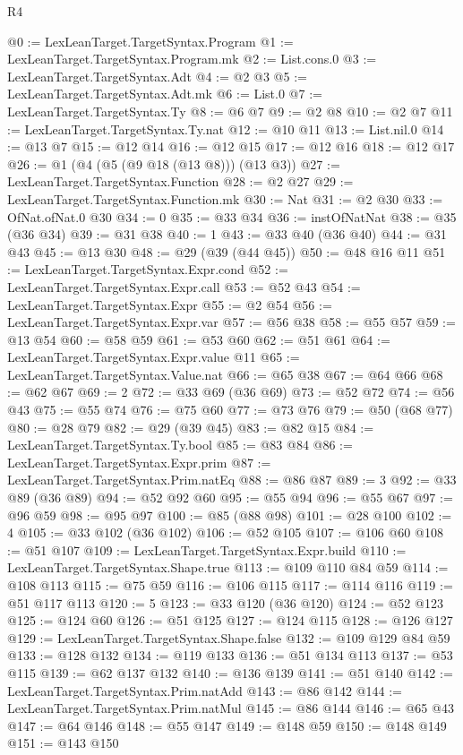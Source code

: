 \begin{lexlean}{R4}
\begin{coremodule}
@0 := LexLeanTarget.TargetSyntax.Program
@1 := LexLeanTarget.TargetSyntax.Program.mk
@2 := List.cons.{0}
@3 := LexLeanTarget.TargetSyntax.Adt
@4 := @2 @3
@5 := LexLeanTarget.TargetSyntax.Adt.mk
@6 := List.{0}
@7 := LexLeanTarget.TargetSyntax.Ty
@8 := @6 @7
@9 := @2 @8
@10 := @2 @7
@11 := LexLeanTarget.TargetSyntax.Ty.nat
@12 := @10 @11
@13 := List.nil.{0}
@14 := @13 @7
@15 := @12 @14
@16 := @12 @15
@17 := @12 @16
@18 := @12 @17
@26 := @1 (@4 (@5 (@9 @18 (@13 @8))) (@13 @3))
@27 := LexLeanTarget.TargetSyntax.Function
@28 := @2 @27
@29 := LexLeanTarget.TargetSyntax.Function.mk
@30 := Nat
@31 := @2 @30
@33 := OfNat.ofNat.{0} @30
@34 := 0
@35 := @33 @34
@36 := instOfNatNat
@38 := @35 (@36 @34)
@39 := @31 @38
@40 := 1
@43 := @33 @40 (@36 @40)
@44 := @31 @43
@45 := @13 @30
@48 := @29 (@39 (@44 @45))
@50 := @48 @16 @11
@51 := LexLeanTarget.TargetSyntax.Expr.cond
@52 := LexLeanTarget.TargetSyntax.Expr.call
@53 := @52 @43
@54 := LexLeanTarget.TargetSyntax.Expr
@55 := @2 @54
@56 := LexLeanTarget.TargetSyntax.Expr.var
@57 := @56 @38
@58 := @55 @57
@59 := @13 @54
@60 := @58 @59
@61 := @53 @60
@62 := @51 @61
@64 := LexLeanTarget.TargetSyntax.Expr.value @11
@65 := LexLeanTarget.TargetSyntax.Value.nat
@66 := @65 @38
@67 := @64 @66
@68 := @62 @67
@69 := 2
@72 := @33 @69 (@36 @69)
@73 := @52 @72
@74 := @56 @43
@75 := @55 @74
@76 := @75 @60
@77 := @73 @76
@79 := @50 (@68 @77)
@80 := @28 @79
@82 := @29 (@39 @45)
@83 := @82 @15
@84 := LexLeanTarget.TargetSyntax.Ty.bool
@85 := @83 @84
@86 := LexLeanTarget.TargetSyntax.Expr.prim
@87 := LexLeanTarget.TargetSyntax.Prim.natEq
@88 := @86 @87
@89 := 3
@92 := @33 @89 (@36 @89)
@94 := @52 @92 @60
@95 := @55 @94
@96 := @55 @67
@97 := @96 @59
@98 := @95 @97
@100 := @85 (@88 @98)
@101 := @28 @100
@102 := 4
@105 := @33 @102 (@36 @102)
@106 := @52 @105
@107 := @106 @60
@108 := @51 @107
@109 := LexLeanTarget.TargetSyntax.Expr.build
@110 := LexLeanTarget.TargetSyntax.Shape.true
@113 := @109 @110 @84 @59
@114 := @108 @113
@115 := @75 @59
@116 := @106 @115
@117 := @114 @116
@119 := @51 @117 @113
@120 := 5
@123 := @33 @120 (@36 @120)
@124 := @52 @123
@125 := @124 @60
@126 := @51 @125
@127 := @124 @115
@128 := @126 @127
@129 := LexLeanTarget.TargetSyntax.Shape.false
@132 := @109 @129 @84 @59
@133 := @128 @132
@134 := @119 @133
@136 := @51 @134 @113
@137 := @53 @115
@139 := @62 @137 @132
@140 := @136 @139
@141 := @51 @140
@142 := LexLeanTarget.TargetSyntax.Prim.natAdd
@143 := @86 @142
@144 := LexLeanTarget.TargetSyntax.Prim.natMul
@145 := @86 @144
@146 := @65 @43
@147 := @64 @146
@148 := @55 @147
@149 := @148 @59
@150 := @148 @149
@151 := @143 @150

\end{coremodule}
\end{lexlean}

